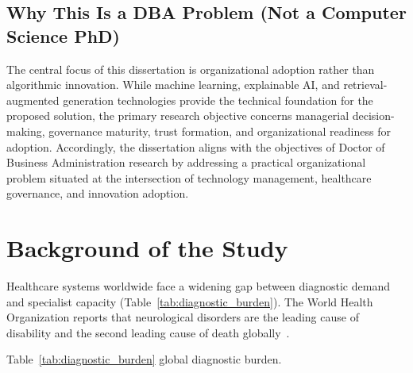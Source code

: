 \subsection{Why This Is a DBA Problem (Not a Computer Science PhD)}
\label{sec:why_dba_problem}

\noindent The central focus of this dissertation is organizational adoption rather than algorithmic innovation. While machine learning, explainable AI, and retrieval-augmented generation technologies provide the technical foundation for the proposed solution, the primary research objective concerns managerial decision-making, governance maturity, trust formation, and organizational readiness for adoption. Accordingly, the dissertation aligns with the objectives of Doctor of Business Administration research by addressing a practical organizational problem situated at the intersection of technology management, healthcare governance, and innovation adoption.

\section{Background of the Study}
\label{sec:background}

Healthcare systems worldwide face a widening gap between diagnostic demand and specialist capacity (Table~\ref{tab:diagnostic_burden}). The World Health Organization reports that neurological disorders are the leading cause of disability and the second leading cause of death globally~\cite{who2024neuro}.


\label{tab:diagnostic_burden}
\label{tab:non_claims}
\label{tab:study_scope}
\label{fig:unified_framework}
\label{tab:boundary_conditions}
\iffalse %
\noindent Table~\ref{tab:diagnostic_burden} global diagnostic burden.

